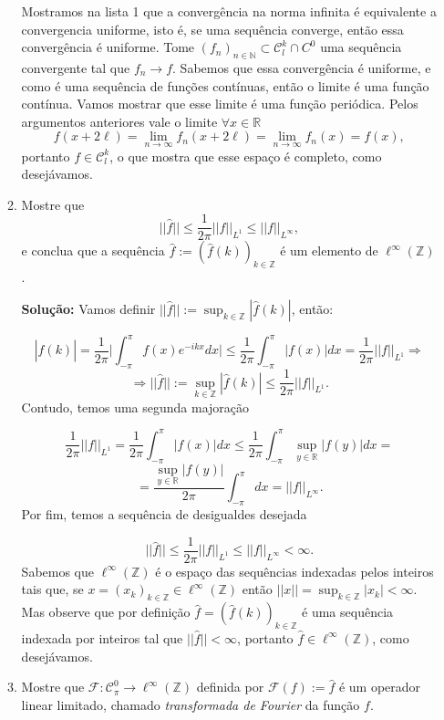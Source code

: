 \documentclass{article}
\begin{document}
\begin{enumerate}
\begin{enumerate}
			Mostramos na lista 1 que a convergência na norma infinita é equivalente a convergencia uniforme, isto é, se uma sequência converge, então essa convergência é uniforme. Tome $(f_{n})_{n \in \mathbb{N}} \subset \mathcal{C}^{k}_{l} \cap C^{0}$ uma sequência convergente tal que $f_{n} \to f$. Sabemos que essa convergência é uniforme, e como é uma sequência de funções contínuas, então o limite é uma função contínua. Vamos mostrar que esse limite é uma função periódica. Pelos argumentos anteriores vale o limite $\forall x \in \mathbb{R}$ 
			$$
			f(x + 2\ell) = \lim\limits_{n\to \infty} f_{n}(x + 2\ell) = \lim\limits_{n\to \infty} f_{n}(x ) = f(x),
			$$
			portanto $f \in \mathcal{C}^{k}_{l}$, o que mostra que esse espaço é completo, como desejávamos.
			
			\item Mostre que
			$$
			||\hat{f}|| \leq \frac{1}{2\pi}||f||_{L^{1}}\leq ||f||_{L^{\infty}},
			$$
			e conclua que a sequência $\hat{f} := (\hat{f}(k))_{k \in \mathbb{Z}}$ é um elemento de $\ell^{\infty}(\mathbb{Z})$.
			
			\textbf{Solução:} Vamos definir $||\hat{f}||:= \sup_{k \in \mathbb{Z}}|\hat{f}(k)|$, então:
			
			$$
			|\hat{f}(k)| = \frac{1}{2\pi} \Big |\int_{-\pi}^{\pi} f(x)e^{-ikx}dx \Big | \leq \frac{1}{2\pi} \int_{-\pi}^{\pi} |f(x)|dx = \frac{1}{2\pi}||f||_{L^{1}} \Rightarrow  
			$$
			$$
			\Rightarrow ||\hat{f}||:= \sup_{k \in \mathbb{Z}}|\hat{f}(k)| \leq \frac{1}{2\pi}||f||_{L^{1}}.
			$$
			Contudo, temos uma segunda majoração
			
			$$
			\frac{1}{2\pi}||f||_{L^{1}}= \frac{1}{2\pi} \int_{-\pi}^{\pi} |f(x)|dx \leq \frac{1}{2\pi} \int_{-\pi}^{\pi} \sup_{y \in \mathbb{R}}|f(y)|dx = 
			$$
			$$
			= \frac{\sup_{y \in \mathbb{R}}|f(y)|}{2\pi} \int_{-\pi}^{\pi} dx = ||f||_{L^{\infty}}.
			$$
			Por fim, temos a sequência de desigualdes desejada
			
			$$
			||\hat{f}|| \leq \frac{1}{2\pi}||f||_{L^{1}}\leq ||f||_{L^{\infty}} < \infty.
			$$
			Sabemos que $\ell^{\infty}(\mathbb{Z})$ é o espaço das sequências indexadas pelos inteiros tais que, se $x = (x_{k})_{k \in \mathbb{Z}} \in \ell^{\infty}(\mathbb{Z})$ então $||x|| = \sup_{k \in \mathbb{Z}}|x_{k}| < \infty$. Mas observe que por definição $\hat{f} = (\hat{f}(k))_{k \in \mathbb{Z}}$ é uma sequência indexada por inteiros tal que $||\hat{f}|| <\infty$, portanto $\hat{f} \in \ell^{\infty}(\mathbb{Z})$, como desejávamos.
			
			\item Mostre que $\mathcal{F}: \mathcal{C}^{0}_{\pi} \to \ell^{\infty}(\mathbb{Z})$ definida por $\mathcal{F}(f) := \hat{f}$ é um operador linear limitado, chamado \textit{transformada de Fourier} da função $f$.
			

\end{enumerate}
\end{enumerate}
\end{document}
